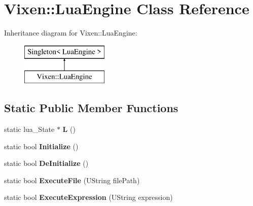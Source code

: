 \hypertarget{class_vixen_1_1_lua_engine}{}\section{Vixen\+:\+:Lua\+Engine Class Reference}
\label{class_vixen_1_1_lua_engine}
Inheritance diagram for Vixen\+:\+:Lua\+Engine\+:\begin{figure}[H]
\begin{center}
\leavevmode
\includegraphics[height=2.000000cm]{class_vixen_1_1_lua_engine}
\end{center}
\end{figure}
\subsection*{Static Public Member Functions}
\begin{DoxyCompactItemize}
\item 
\hypertarget{class_vixen_1_1_lua_engine_adc4092a40257827214c2e2a3219ca171}{}static lua\+\_\+\+State $\ast$ {\bfseries L} ()\label{class_vixen_1_1_lua_engine_adc4092a40257827214c2e2a3219ca171}

\item 
\hypertarget{class_vixen_1_1_lua_engine_a27ce054d29eef51f93e6e10a77b58055}{}static bool {\bfseries Initialize} ()\label{class_vixen_1_1_lua_engine_a27ce054d29eef51f93e6e10a77b58055}

\item 
\hypertarget{class_vixen_1_1_lua_engine_a2ccf0fc552318e518661abced74e825e}{}static bool {\bfseries De\+Initialize} ()\label{class_vixen_1_1_lua_engine_a2ccf0fc552318e518661abced74e825e}

\item 
\hypertarget{class_vixen_1_1_lua_engine_a4139fcdd1ceacb2ce8ddfb52d543fde5}{}static bool {\bfseries Execute\+File} (U\+String file\+Path)\label{class_vixen_1_1_lua_engine_a4139fcdd1ceacb2ce8ddfb52d543fde5}

\item 
\hypertarget{class_vixen_1_1_lua_engine_a9f0ec0acf951562bbd9ed98767390bb1}{}static bool {\bfseries Execute\+Expression} (U\+String expression)\label{class_vixen_1_1_lua_engine_a9f0ec0acf951562bbd9ed98767390bb1}

\end{DoxyCompactItemize}
